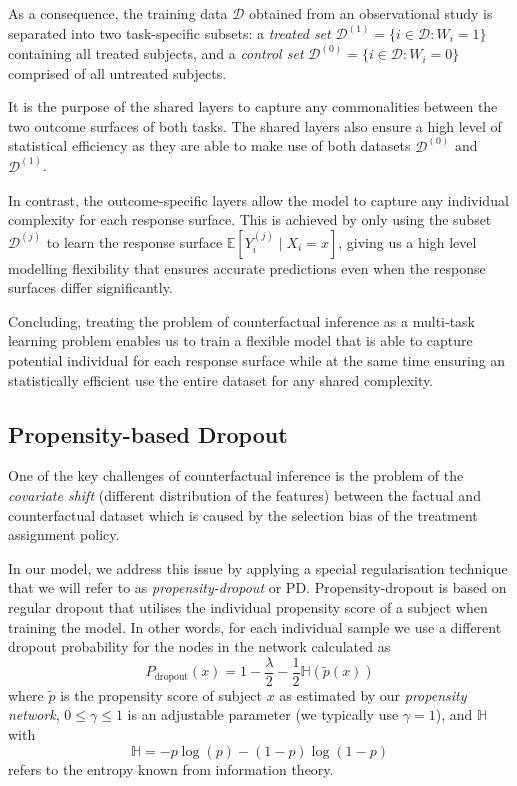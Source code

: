 As a consequence, the training data $\mathcal{D}$ obtained from an observational study is separated into two task-specific subsets: a \emph{treated set} $\mathcal{D}^{(1)} = \{i \in \mathcal{D} : W_i = 1\}$ containing all treated subjects, and a \emph{control set} $\mathcal{D}^{(0)} = \{i \in \mathcal{D} : W_i = 0\}$ comprised of all untreated subjects. 

It is the purpose of the shared layers to capture any commonalities between the two outcome surfaces of both tasks. The shared layers also ensure a high level of statistical efficiency as they are able to make use of both datasets $\mathcal{D}^{(0)}$ and $\mathcal{D}^{(1)}$. 

In contrast, the outcome-specific layers allow the model to capture any individual complexity for each response surface. This is achieved by only using the subset $\mathcal{D}^{(j)}$ to learn the response surface $\mathbb{E}[Y_i^{(j)} \mid X_i = x]$, giving us a high level modelling flexibility that ensures accurate predictions even when the response surfaces differ significantly. 

Concluding, treating the problem of counterfactual inference as a multi-task learning problem enables us to train a flexible model that is able to capture potential individual for each response surface while at the same time ensuring an statistically efficient use the entire dataset for any shared complexity. 
	
\subsection{Propensity-based Dropout} \label{sec:propensity-based-dropout}
One of the key challenges of counterfactual inference is the problem of the \emph{covariate shift} (different distribution of the features) between the factual and counterfactual dataset which is caused by the selection bias of the treatment assignment policy.

In our model, we address this issue by applying a special regularisation technique that we will refer to as \emph{propensity-dropout} or PD. Propensity-dropout is based on regular dropout %
that utilises the individual propensity score of a subject when training the model. In other words, for each individual sample we use a different dropout probability for the nodes in the network calculated as
\begin{equation}
P_{\text{dropout}}(x) = 1 - \frac{\lambda}{2} - \frac{1}{2} \mathbb{H}(\tilde{p}(x))
\end{equation}
where $\tilde{p}$ is the propensity score of subject $x$ as estimated by our \emph{propensity network}, $0 \leq \gamma \leq 1$ is an adjustable parameter (we typically use $\gamma = 1$), and $\mathbb{H}$ with
\begin{equation}
\mathbb{H} = -p \log (p) - (1-p)\log (1-p)
\end{equation}
refers to the entropy %
known from information theory. 

